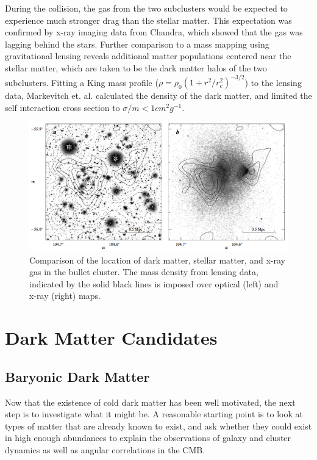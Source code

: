 During the collision, the gas from the two subclusters would be expected to experience much stronger drag than the stellar matter. This expectation was confirmed by x-ray imaging data from Chandra, which showed that the gas was lagging behind the stars. Further comparison to a mass mapping using gravitational lensing reveals additional matter populations centered near the stellar matter, which are taken to be the dark matter halos of the two subclusters. Fitting a King mass profile ($\rho=\rho_{0}(1+r^{2}/r_{c}^{2})^{-3/2}$) to the lensing data, Markevitch et. al. calculated the density of the dark matter, and limited the self interaction cross section to $\sigma/m < 1 cm^{2} g^{-1}$\cite{markevitch}.

\begin{figure}[h!]
\centering
\includegraphics[width=150mm]{Figures/bullet}
\caption{Comparison of the location of dark matter, stellar matter, and x-ray gas in the bullet cluster. The mass density from lensing data, indicated by the solid black lines is imposed over optical (left) and x-ray (right) maps\cite{markevitch}.}
\end{figure}

\section{Dark Matter Candidates}
\subsection{Baryonic Dark Matter}
Now that the existence of cold dark matter has been well motivated, the next step is to investigate what it might be. A reasonable starting point is to look at types of matter that are already known to exist, and ask whether they could exist in high enough abundances to explain the observations of galaxy and cluster dynamics as well as angular correlations in the CMB.  

